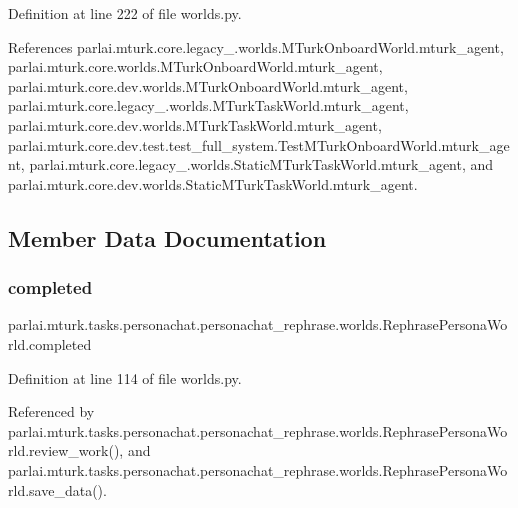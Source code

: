 Definition at line 222 of file worlds.\+py.



References parlai.\+mturk.\+core.\+legacy\+\_.\+worlds.\+M\+Turk\+Onboard\+World.\+mturk\+\_\+agent, parlai.\+mturk.\+core.\+worlds.\+M\+Turk\+Onboard\+World.\+mturk\+\_\+agent, parlai.\+mturk.\+core.\+dev.\+worlds.\+M\+Turk\+Onboard\+World.\+mturk\+\_\+agent, parlai.\+mturk.\+core.\+legacy\+\_.\+worlds.\+M\+Turk\+Task\+World.\+mturk\+\_\+agent, parlai.\+mturk.\+core.\+dev.\+worlds.\+M\+Turk\+Task\+World.\+mturk\+\_\+agent, parlai.\+mturk.\+core.\+dev.\+test.\+test\+\_\+full\+\_\+system.\+Test\+M\+Turk\+Onboard\+World.\+mturk\+\_\+agent, parlai.\+mturk.\+core.\+legacy\+\_.\+worlds.\+Static\+M\+Turk\+Task\+World.\+mturk\+\_\+agent, and parlai.\+mturk.\+core.\+dev.\+worlds.\+Static\+M\+Turk\+Task\+World.\+mturk\+\_\+agent.



\subsection{Member Data Documentation}
\mbox{\label{classparlai_1_1mturk_1_1tasks_1_1personachat_1_1personachat__rephrase_1_1worlds_1_1RephrasePersonaWorld_a7a95471c5eba613fa07ccd9a0bad36da}} 
\subsubsection{\texorpdfstring{completed}{completed}}
{\footnotesize\ttfamily parlai.\+mturk.\+tasks.\+personachat.\+personachat\+\_\+rephrase.\+worlds.\+Rephrase\+Persona\+World.\+completed}



Definition at line 114 of file worlds.\+py.



Referenced by parlai.\+mturk.\+tasks.\+personachat.\+personachat\+\_\+rephrase.\+worlds.\+Rephrase\+Persona\+World.\+review\+\_\+work(), and parlai.\+mturk.\+tasks.\+personachat.\+personachat\+\_\+rephrase.\+worlds.\+Rephrase\+Persona\+World.\+save\+\_\+data().

